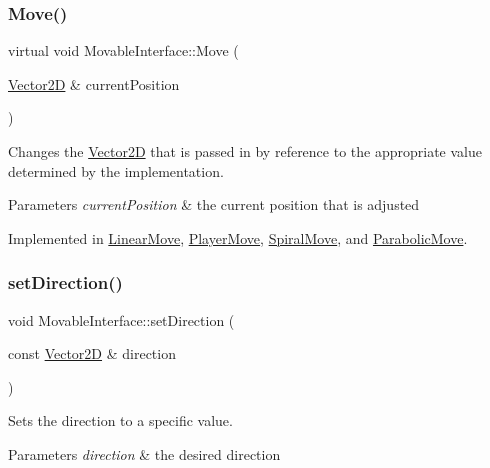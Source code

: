 \subsubsection{\texorpdfstring{Move()}{Move()}}
{\footnotesize\ttfamily virtual void Movable\+Interface\+::\+Move (\begin{DoxyParamCaption}\item[{\hyperlink{class_vector2_d}{Vector2D} \&}]{current\+Position }\end{DoxyParamCaption})\hspace{0.3cm}{\ttfamily [pure virtual]}}



Changes the \hyperlink{class_vector2_d}{Vector2D} that is passed in by reference to the appropriate value determined by the implementation. 


\begin{DoxyParams}{Parameters}
{\em current\+Position} & the current position that is adjusted \\
\hline
\end{DoxyParams}


Implemented in \hyperlink{class_linear_move_a3a7b76828adfaefaaf7b687be499709d}{Linear\+Move}, \hyperlink{class_player_move_a1c39885d4126c63441250eae23ac718a}{Player\+Move}, \hyperlink{class_spiral_move_a74b22995f5f3c00c623ecaa3adb2ab8e}{Spiral\+Move}, and \hyperlink{class_parabolic_move_a577831644247ca57aa1c2c88843c779b}{Parabolic\+Move}.

\mbox{\label{class_movable_interface_ac03895780649f51c762907e8ef3a7694}} 
\subsubsection{\texorpdfstring{set\+Direction()}{setDirection()}}
{\footnotesize\ttfamily void Movable\+Interface\+::set\+Direction (\begin{DoxyParamCaption}\item[{const \hyperlink{class_vector2_d}{Vector2D} \&}]{direction }\end{DoxyParamCaption})\hspace{0.3cm}{\ttfamily [inline]}}



Sets the direction to a specific value. 


\begin{DoxyParams}{Parameters}
{\em direction} & the desired direction \\
\hline
\end{DoxyParams}


